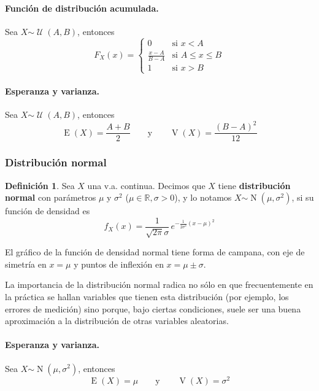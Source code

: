 \documentclass[11pt]{article}
\theoremstyle{plain}
\theoremstyle{definition}
\newtheorem*{defi}{Definición}
\theoremstyle{remark}
\newcommand{\deft}[1]{\textbf{#1}}  %
\newcommand{\esp}[0]{\ensuremath{\operatorname{E}}}  %
\newcommand{\var}[0]{\ensuremath{\operatorname{V}}}  %
\newcommand{\dist}[1]{\ensuremath{\sim \operatorname{#1}}}  %
\newcommand{\unif}[0]{\ensuremath{\mathcal{U}}}  %
\begin{document}
      \paragraph{Función de distribución acumulada.}
      Sea $X \dist{\unif}(A,B)$, entonces
      \[ F_X(x) = \begin{cases}
        0 & \text{si $x < A$} \\
        \displaystyle \frac{x - A}{B - A} & \text{si $A \leq x \leq B$} \\
        1 & \text{si $x > B$}
      \end{cases} \]

      \paragraph{Esperanza y varianza.}
      Sea $X \dist{\unif}(A,B)$, entonces
      \[ \esp(X) = \frac{A + B}{2} \qquad \text{y} \qquad \var(X) = \frac{(B - A)^2}{12} \]

    \subsubsection{Distribución normal}

      \begin{defi}
        Sea $X$ una v.a. continua. Decimos que $X$ tiene \deft{distribución normal} con parámetros $\mu$ y $\sigma^2$ ($\mu \in \mathbb{R}, \sigma > 0$), y lo notamos $X \dist{N}(\mu,\sigma^2)$, si su función de densidad es
        \[ f_X(x) = \frac{1}{\sqrt{2\pi}\sigma} \, e^{- \frac{1}{2\sigma^2}(x - \mu)^2} \]
      \end{defi}

      El gráfico de la función de densidad normal tiene forma de campana, con eje de simetría en $x = \mu$ y puntos de inflexión en $x = \mu \pm \sigma$.

      La importancia de la distribución normal radica no sólo en que frecuentemente en la práctica se hallan variables que tienen esta distribución (por ejemplo, los errores de medición) sino porque, bajo ciertas condiciones, suele ser una buena aproximación a la distribución de otras variables aleatorias.

      \paragraph{Esperanza y varianza.}
      Sea $X \dist{N}(\mu, \sigma^2)$, entonces
      \[ \esp(X) = \mu \qquad \text{y} \qquad \var(X) = \sigma^2 \]
\end{document}
